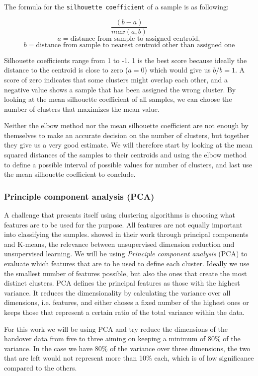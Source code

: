 The formula for the \texttt{silhouette coefficient} of a sample is as following:

\[
	\frac{(b - a)}{max(a, b)}
\]
\[
	a = \text{distance from sample to assigned centroid},
\]
\[
	b = \text{distance from sample to nearest centroid other than assigned one}
\]

Silhouette coefficients range from 1 to -1. 1 is the best score because ideally the distance to the centroid is close to zero (\(a = 0\)) which would give us \(b / b = 1\). A score of zero indicates that some clusters might overlap each other, and a negative value shows a sample that has been assigned the wrong cluster. By looking at the mean silhouette coefficient of all samples, we can choose the number of clusters that maximizes the mean value.

Neither the elbow method nor the mean silhouette coefficient are not enough by themselves to make an accurate decision on the number of clusters, but together they give us a very good estimate. We will therefore start by looking at the mean squared distances of the samples to their centroids and using the elbow method to define a possible interval of possible values for number of clusters, and last use the mean silhouette coefficient to conclude.


\subsubsection{Principle component analysis (PCA)}

A challenge that presents itself using clustering algorithms is choosing what features are to be used for the purpose. All features are not equally important into classifying the samples. \textcite{Ding2004} showed in their work through principal components and K-means, the relevance between unsupervised dimension reduction and unsupervised learning. We will be using \emph{Principle component analysis} (PCA) to evaluate which features that are to be used to define each cluster. Ideally we use the smallest number of features possible, but also the ones that create the most distinct clusters. PCA defines the principal features as those with the highest variance. It reduces the dimensionality by calculating the variance over all dimensions, i.e. features, and either choses a fixed number of the highest ones or keeps those that represent a certain ratio of the total variance within the data.

For this work we will be using PCA and try reduce the dimensions of the handover data from five to three aiming on keeping a minimum of 80\% of the variance. In the case we have 80\% of the variance over three dimensions, the two that are left would not represent more than 10\% each, which is of low significance compared to the others.

